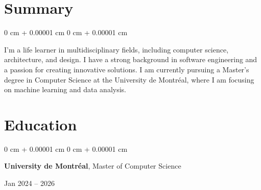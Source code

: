 \documentclass[10pt, letterpaper]{article}
\newenvironment{highlights}{
    \begin{itemize}[
        topsep=0.10 cm,
        parsep=0.10 cm,
        partopsep=0pt,
        itemsep=0pt,
        leftmargin=0 cm + 10pt
    ]
}{
    \end{itemize}
} %
\newenvironment{highlightsforbulletentries}{
    \begin{itemize}[
        topsep=0.10 cm,
        parsep=0.10 cm,
        partopsep=0pt,
        itemsep=0pt,
        leftmargin=10pt
    ]
}{
    \end{itemize}
} %
\newenvironment{onecolentry}{
    \begin{adjustwidth}{
        0 cm + 0.00001 cm
    }{
        0 cm + 0.00001 cm
    }
}{
    \end{adjustwidth}
} %
\newenvironment{twocolentry}[2][]{
    \onecolentry
    \def\secondColumn{#2}
    \setcolumnwidth{\fill, 4.5 cm}
    \begin{paracol}{2}
}{
    \switchcolumn \raggedleft \secondColumn
    \end{paracol}
    \endonecolentry
} %
\begin{document}







    \section{Summary}
        \begin{onecolentry}
            I'm a life learner in multidisciplinary fields, including computer science, architecture, and design. I have a strong background in software engineering and a passion for creating innovative solutions. I am currently pursuing a Master's degree in Computer Science at the University de Montréal, where I am focusing on machine learning and data analysis.
        \end{onecolentry}


    \section{Education} 
        \begin{twocolentry}{
            Jan 2024 – 2026
        }
            \textbf{University de Montréal}, Master of Computer Science
        \end{twocolentry}

\end{document}
